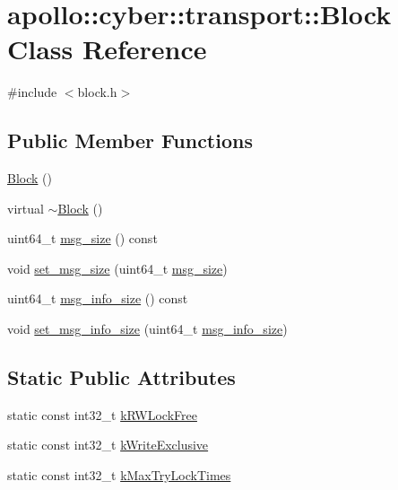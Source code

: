 \hypertarget{classapollo_1_1cyber_1_1transport_1_1Block}{\section{apollo\-:\-:cyber\-:\-:transport\-:\-:Block Class Reference}
\label{classapollo_1_1cyber_1_1transport_1_1Block}
}


{\ttfamily \#include $<$block.\-h$>$}

\subsection*{Public Member Functions}
\begin{DoxyCompactItemize}
\item 
\hyperlink{classapollo_1_1cyber_1_1transport_1_1Block_a9069d5ba3265d520033ffdccf5d42467}{Block} ()
\item 
virtual \hyperlink{classapollo_1_1cyber_1_1transport_1_1Block_a4bea887c31217d39b284cc606d7f62b0}{$\sim$\-Block} ()
\item 
uint64\-\_\-t \hyperlink{classapollo_1_1cyber_1_1transport_1_1Block_a94adc49b2be3c61768a567ed38578a91}{msg\-\_\-size} () const 
\item 
void \hyperlink{classapollo_1_1cyber_1_1transport_1_1Block_a31948abbf6b568069943e4b3001a2b3f}{set\-\_\-msg\-\_\-size} (uint64\-\_\-t \hyperlink{classapollo_1_1cyber_1_1transport_1_1Block_a94adc49b2be3c61768a567ed38578a91}{msg\-\_\-size})
\item 
uint64\-\_\-t \hyperlink{classapollo_1_1cyber_1_1transport_1_1Block_af4572d31a030678c23048cafbdaae546}{msg\-\_\-info\-\_\-size} () const 
\item 
void \hyperlink{classapollo_1_1cyber_1_1transport_1_1Block_a529dec981a8273703c565063b9d74378}{set\-\_\-msg\-\_\-info\-\_\-size} (uint64\-\_\-t \hyperlink{classapollo_1_1cyber_1_1transport_1_1Block_af4572d31a030678c23048cafbdaae546}{msg\-\_\-info\-\_\-size})
\end{DoxyCompactItemize}
\subsection*{Static Public Attributes}
\begin{DoxyCompactItemize}
\item 
static const int32\-\_\-t \hyperlink{classapollo_1_1cyber_1_1transport_1_1Block_a4c116708012944222d2085da107ef9e9}{k\-R\-W\-Lock\-Free}
\item 
static const int32\-\_\-t \hyperlink{classapollo_1_1cyber_1_1transport_1_1Block_aae8790e464c9baf1dcfbaa5e836dd3bb}{k\-Write\-Exclusive}
\item 
static const int32\-\_\-t \hyperlink{classapollo_1_1cyber_1_1transport_1_1Block_ab6478a1a49b3f2edbfb4355d16d19ec2}{k\-Max\-Try\-Lock\-Times}
\end{DoxyCompactItemize}
